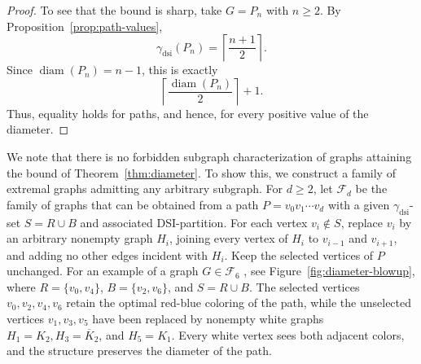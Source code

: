 \documentclass[11pt]{article}
\theoremstyle{definition}
\theoremstyle{remark}
\newcommand{\cF}{{\mathcal{F}}}
\newcommand{\dsi}{\mathrm{dsi}}
\newcommand{\diam}{\operatorname{diam}}
\newcommand{\barK}{\overline{K}}
\begin{document}
\begin{proof}
To see that the bound is sharp, take \(G=P_n\) with \(n\ge 2\). By
Proposition~\ref{prop:path-values},
\[
   \gamma_{\dsi}(P_n)=\left\lceil\frac{n+1}{2}\right\rceil.
\]
Since \(\diam(P_n)=n-1\), this is exactly
\[
   \left\lceil\frac{\diam(P_n)}{2}\right\rceil+1.
\]
Thus, equality holds for paths, and hence, for every positive value of the
diameter.
\end{proof}


We note that there is no forbidden subgraph characterization of graphs attaining the bound of  Theorem~\ref{thm:diameter}.  To show this, we construct a family  of extremal graphs admitting any arbitrary subgraph.  For $d \ge 2$, let $\cF_d$ be the family of graphs that can be obtained from a path \(P=v_0v_1\cdots v_d\)  with a given  $\gamma_{\dsi}$-set  $S= R \cup B$ and  associated 
DSI-partition. For each vertex \(v_i\notin S\), replace
\(v_i\) by an arbitrary nonempty graph \(H_i\), joining every vertex of
\(H_i\) to \(v_{i-1}\) and \(v_{i+1}\), and adding no other edges incident
with \(H_i\). Keep the selected vertices of \(P\) unchanged.   
For an example of a graph $G \in \cF_6$ , see  Figure~\ref{fig:diameter-blowup}, where  \(R = \{v_0,v_4\}\), \(B = \{v_2,v_6\}\), and \(S = R \cup B\).   The selected
vertices \(v_0,v_2,v_4,v_6\) retain the optimal red-blue coloring of the
path, while the unselected vertices \(v_1,v_3,v_5\) have been replaced by
nonempty white graphs \(H_1 = K_2, H_3 = \barK_2\), and \(H_5 = K_1\). Every white vertex sees both adjacent
colors, and the structure preserves the diameter of the path.
\end{document}
